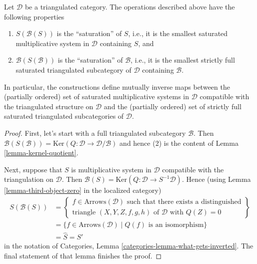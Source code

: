 \begin{lemma}
\label{lemma-operations}
Let $\mathcal{D}$ be a triangulated category. The operations described above
have the following properties
\begin{enumerate}
\item $S(\mathcal{B}(S))$ is the ``saturation'' of $S$, i.e., it is the
smallest saturated multiplicative system in $\mathcal{D}$ containing $S$, and
\item $\mathcal{B}(S(\mathcal{B}))$ is the ``saturation'' of $\mathcal{B}$,
i.e., it is the smallest strictly full saturated triangulated subcategory of
$\mathcal{D}$ containing $\mathcal{B}$.
\end{enumerate}
In particular, the constructions define mutually inverse maps between
the (partially ordered) set of saturated multiplicative systems in
$\mathcal{D}$ compatible with the triangulated structure on $\mathcal{D}$
and
the (partially ordered) set of strictly full saturated triangulated
subcategories of $\mathcal{D}$.
\end{lemma}

\begin{proof}
First, let's start with a full triangulated subcategory $\mathcal{B}$. Then
$\mathcal{B}(S(\mathcal{B})) =
\text{Ker}(Q : \mathcal{D} \to \mathcal{D}/\mathcal{B})$
and hence (2) is the content of
Lemma \ref{lemma-kernel-quotient}.

\medskip\noindent
Next, suppose that $S$ is multiplicative system in $\mathcal{D}$ compatible
with the triangulation on $\mathcal{D}$. Then
$\mathcal{B}(S) = \text{Ker}(Q : \mathcal{D} \to S^{-1}\mathcal{D})$.
Hence (using
Lemma \ref{lemma-third-object-zero}
in the localized category)
\begin{align*}
S(\mathcal{B}(S))
& =
\left\{
\begin{matrix}
f \in \text{Arrows}(\mathcal{D})
\text{ such that there exists a distinguished}\\
\text{triangle }(X, Y, Z, f, g, h) \text{ of }\mathcal{D}\text{ with }Q(Z) = 0
\end{matrix}
\right\}
\\
& =
\{f \in \text{Arrows}(\mathcal{D}) \mid Q(f)\text{ is an isomorphism}\} \\
& = \hat S = S'
\end{align*}
in the notation of
Categories, Lemma \ref{categories-lemma-what-gets-inverted}.
The final statement of that lemma finishes the proof.
\end{proof}

